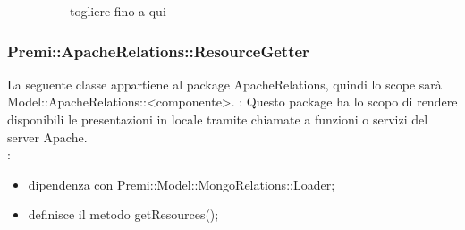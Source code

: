{{				
			}
			---------------togliere fino a qui----------
			\subsubsection{Premi::ApacheRelations::ResourceGetter}{
							La seguente classe appartiene al package ApacheRelations, quindi lo scope sarà \\Model::ApacheRelations::<componente>.
						   	\textbf{\tipo}: Questo package ha lo scopo di rendere disponibili le presentazioni in locale tramite chiamate a funzioni o servizi del server Apache.    \\
						   	\textbf{\relaz}:
						   	\begin{itemize}
						   		\item dipendenza con Premi::Model::MongoRelations::Loader;
						   		\item definisce il metodo getResources();
						   	\end{itemize}
	}
}